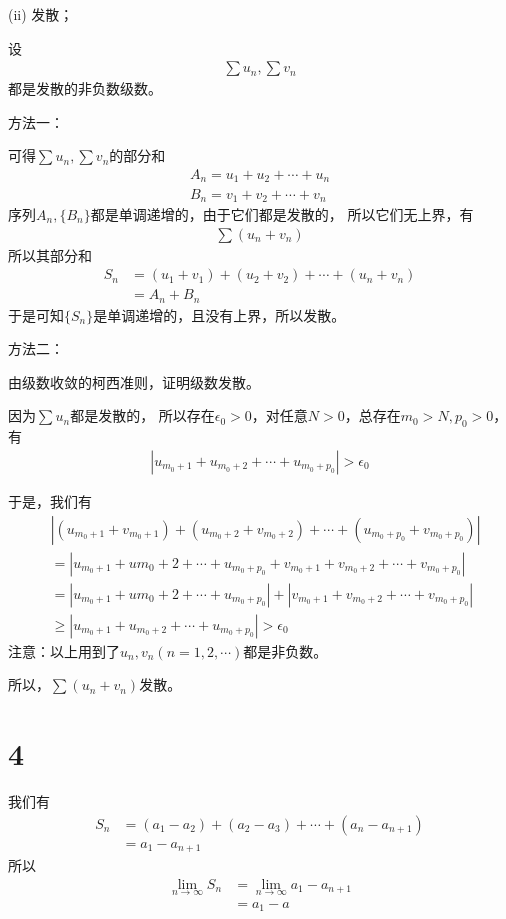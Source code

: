 \documentclass{article}
\begin{document}
(ii) 发散；

设
\begin{align*}
  \sum u_n, \sum v_n
\end{align*}
都是发散的非负数级数。

方法一：

可得$\sum u_n, \sum v_n$的部分和
\begin{align*}
  A_n = u_1 + u_2 + \cdots + u_n \\
  B_n = v_1 + v_2 + \cdots + v_n
\end{align*}
序列${A_n}, \{B_n\}$都是单调递增的，由于它们都是发散的，
所以它们无上界，有
\begin{align*}
  \sum (u_n + v_n)
\end{align*}
所以其部分和
\begin{align*}
  S_n & = (u_1 + v_1) + (u_2 + v_2) + \cdots + (u_n + v_n) \\
      & = A_n + B_n
\end{align*}
于是可知$\{S_n\}$是单调递增的，且没有上界，所以发散。

方法二：

由级数收敛的柯西准则，证明级数发散。

因为$\sum u_n$都是发散的，
所以存在$\epsilon_0 > 0$，对任意$N > 0$，总存在$m_0 > N, p_0 > 0$，有
\begin{align*}
  |u_{m_0 + 1} + u_{m_0 + 2} + \cdots + u_{m_0 + p_0}| > \epsilon_0
\end{align*}

于是，我们有
\begin{align*}
   & |(u_{m_0 + 1} + v_{m_0 + 1}) + (u_{m_0 + 2} + v_{m_0 + 2}) + \cdots + (u_{m_0 + p_0} + v_{m_0 + p_0})|        \\
   & = |u_{m_0 + 1} + u{m_0 + 2} + \cdots + u_{m_0 + p_0} + v_{m_0 + 1} + v_{m_0 + 2} + \cdots + v_{m_0 + p_0}|    \\
   & = |u_{m_0 + 1} + u{m_0 + 2} + \cdots + u_{m_0 + p_0} | + |v_{m_0 + 1} + v_{m_0 + 2} + \cdots + v_{m_0 + p_0}| \\
   & \geq |u_{m_0 + 1} + u_{m_0 + 2} + \cdots + u_{m_0 + p_0}| > \epsilon_0
\end{align*}
注意：以上用到了$u_n, v_n (n = 1, 2, \cdots)$都是非负数。

所以，$\sum (u_n + v_n)$发散。

\section*{4}

我们有
\begin{align*}
  S_n & = (a_1 - a_2) + (a_2 - a_3) + \cdots + (a_n - a_{n + 1}) \\
      & = a_1 - a_{n + 1}
\end{align*}
所以
\begin{align*}
  \lim\limits_{n \to \infty} S_n & = \lim\limits_{n \to \infty} a_1 - a_{n + 1} \\
                                 & = a_1 - a
\end{align*}
\end{document}
